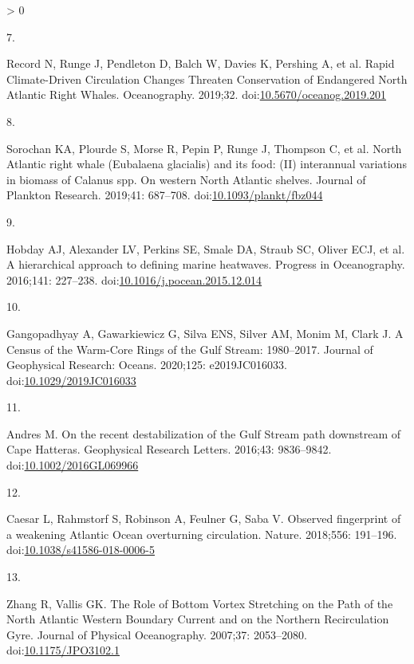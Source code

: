 \documentclass[
  10pt,
]{article}
\newlength{\cslhangindent}
\newlength{\csllabelwidth}
\newenvironment{CSLReferences}[2] %
 {%
  \setlength{\parindent}{0pt}
  \ifodd #1 \everypar{\setlength{\hangindent}{\cslhangindent}}\ignorespaces\fi
  \ifnum #2 > 0
  \setlength{\parskip}{#2\baselineskip}
  \fi
 }%
 {}
\newcommand{\CSLLeftMargin}[1]{\parbox[t]{\csllabelwidth}{#1}}
\newcommand{\CSLRightInline}[1]{\parbox[t]{\linewidth - \csllabelwidth}{#1}\break}
\begin{document}
\begin{CSLReferences}{0}{0}
\leavevmode\hypertarget{ref-record_rapid_2019}{}%
\CSLLeftMargin{7. }
\CSLRightInline{Record N, Runge J, Pendleton D, Balch W, Davies K,
Pershing A, et al. Rapid {Climate}-{Driven} {Circulation} {Changes}
{Threaten} {Conservation} of {Endangered} {North} {Atlantic} {Right}
{Whales}. Oceanography. 2019;32.
doi:\href{https://doi.org/10.5670/oceanog.2019.201}{10.5670/oceanog.2019.201}}

\leavevmode\hypertarget{ref-sorochan_north_2019}{}%
\CSLLeftMargin{8. }
\CSLRightInline{Sorochan KA, Plourde S, Morse R, Pepin P, Runge J,
Thompson C, et al. North {Atlantic} right whale ({Eubalaena} glacialis)
and its food: ({II}) interannual variations in biomass of {Calanus} spp.
On western {North} {Atlantic} shelves. Journal of Plankton Research.
2019;41: 687--708.
doi:\href{https://doi.org/10.1093/plankt/fbz044}{10.1093/plankt/fbz044}}

\leavevmode\hypertarget{ref-hobday_hierarchical_2016}{}%
\CSLLeftMargin{9. }
\CSLRightInline{Hobday AJ, Alexander LV, Perkins SE, Smale DA, Straub
SC, Oliver ECJ, et al. A hierarchical approach to defining marine
heatwaves. Progress in Oceanography. 2016;141: 227--238.
doi:\href{https://doi.org/10.1016/j.pocean.2015.12.014}{10.1016/j.pocean.2015.12.014}}

\leavevmode\hypertarget{ref-gangopadhyay_census_2020}{}%
\CSLLeftMargin{10. }
\CSLRightInline{Gangopadhyay A, Gawarkiewicz G, Silva ENS, Silver AM,
Monim M, Clark J. A {Census} of the {Warm}-{Core} {Rings} of the {Gulf}
{Stream}: 1980--2017. Journal of Geophysical Research: Oceans. 2020;125:
e2019JC016033.
doi:\href{https://doi.org/10.1029/2019JC016033}{10.1029/2019JC016033}}

\leavevmode\hypertarget{ref-andres_recent_2016}{}%
\CSLLeftMargin{11. }
\CSLRightInline{Andres M. On the recent destabilization of the {Gulf}
{Stream} path downstream of {Cape} {Hatteras}. Geophysical Research
Letters. 2016;43: 9836--9842.
doi:\href{https://doi.org/10.1002/2016GL069966}{10.1002/2016GL069966}}

\leavevmode\hypertarget{ref-caesar_observed_2018}{}%
\CSLLeftMargin{12. }
\CSLRightInline{Caesar L, Rahmstorf S, Robinson A, Feulner G, Saba V.
Observed fingerprint of a weakening {Atlantic} {Ocean} overturning
circulation. Nature. 2018;556: 191--196.
doi:\href{https://doi.org/10.1038/s41586-018-0006-5}{10.1038/s41586-018-0006-5}}

\leavevmode\hypertarget{ref-zhang_role_2007}{}%
\CSLLeftMargin{13. }
\CSLRightInline{Zhang R, Vallis GK. The {Role} of {Bottom} {Vortex}
{Stretching} on the {Path} of the {North} {Atlantic} {Western}
{Boundary} {Current} and on the {Northern} {Recirculation} {Gyre}.
Journal of Physical Oceanography. 2007;37: 2053--2080.
doi:\href{https://doi.org/10.1175/JPO3102.1}{10.1175/JPO3102.1}}


\end{CSLReferences}
\end{document}
